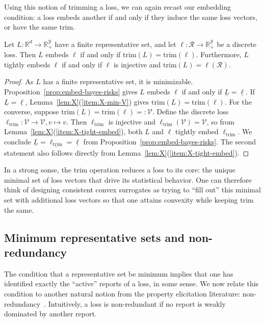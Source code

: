 \documentclass[twoside,11pt]{article}
\newcommand{\reals}{\mathbb{R}}
\newcommand{\R}{\mathcal{R}}
\newcommand{\V}{\mathcal{V}}
\newcommand{\Y}{\mathcal{Y}}
\newcommand{\risk}[1]{\underline{#1}}
\newcommand{\trim}{\mathrm{trim}}
\newcommand{\trimcover}{\mathrm{trim}}
\begin{document}
Using this notion of trimming a loss, we can again recast our embedding condition: a loss embeds another if and only if they induce the same loss vectors, or have the same $\trimcover$.

\begin{proposition}\label{prop:embed-iff-trims-equal}
  Let $L:\reals^d\to\reals^\Y_+$ have a finite representative set, and let $\ell:\R\to\reals^\Y_+$ be a discrete loss.
  Then $L$ embeds $\ell$ if and only if $\trimcover(L) = \trimcover(\ell)$.
  Furthermore, $L$ tightly embeds $\ell$ if and only if $\ell$ is injective and $\trimcover(L) = \ell(\R)$.
\end{proposition}
\begin{proof}
  As $L$ has a finite representative set, it is minimizable.
  Proposition~\ref{prop:embed-bayes-risks} gives $L$ embeds $\ell$ if and only if $\risk L = \risk \ell$.
  If $\risk L = \risk \ell$, Lemma~\ref{lem:X}(\ref{item:X-min-V}) gives $\trim(L) = \trim(\ell)$.
  For the converse, suppose $\trim(L) = \trim(\ell) =: \V$.
  Define the discrete loss $\ell_\trim : \V \to \V, v\mapsto v$.
  Then $\ell_\trim$ is injective and $\ell_\trim(\V) = \V$, so from Lemma~\ref{lem:X}(\ref{item:X-tight-embed}), both $L$ and $\ell$ tightly embed $\ell_\trim$.
  We conclude $\risk L = \risk{\ell_\trim} = \risk \ell$ from Proposition~\ref{prop:embed-bayes-risks}.
  The second statement also follows directly from Lemma~\ref{lem:X}(\ref{item:X-tight-embed}).
\end{proof}

In a strong sonse, the trim operation reduces a loss to its core: the unique minimal set of loss vectors that drive its statistical behavior.
One can therefore think of designing consistent convex surrogates as trying to ``fill out'' this minimal set with additional loss vectors so that one attains convexity while keeping trim the same.

\subsection{Minimum representative sets and non-redundancy}
\label{sec:min-rep-sets-trim}

The condition that a representative set be minimum implies that one has identified exactly the ``active'' reports of a loss, in some sense.
We now relate this condition to another natural notion from the property elicitation literature: non-redundancy~\citep{frongillo2014general,lambert2018elicitation}.
Intuitively, a loss is non-redundant if no report is weakly dominated by another report.
\end{document}
